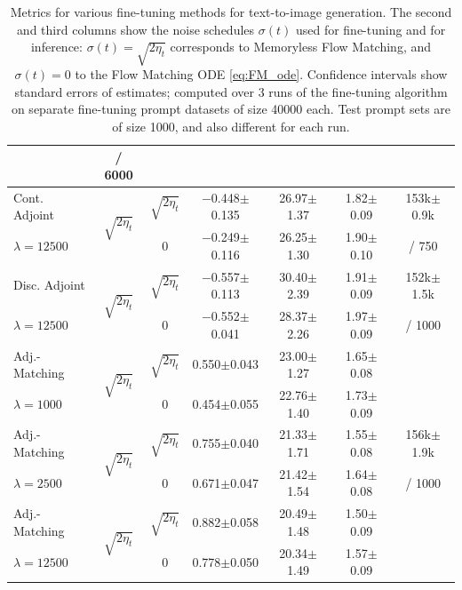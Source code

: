\begin{table}[h!]
{\begin{tabular}{lcccccc}
    & / 6000 
    \\
    \midrule %
    Cont. Adjoint & \multirow{2}{*}{$\sqrt{2 \eta_t}$} & $\sqrt{2 \eta_t}$ & $-$0.448{\tiny$\pm$0.135} & 26.97{\tiny$\pm$1.37} & 1.82{\tiny$\pm$0.09} 
    & 153k{\tiny$\pm$0.9k}
    \\
    $\lambda = 12500$                     &                                    & 0                 & $-$0.249{\tiny$\pm$0.116} & 26.25{\tiny$\pm$1.30} & 1.90{\tiny$\pm$0.10} 
    & / 750  
    \\
    \addlinespace
    Disc. Adjoint & \multirow{2}{*}{$\sqrt{2 \eta_t}$} & $\sqrt{2 \eta_t}$ & $-$0.557{\tiny$\pm$0.113} & 30.40{\tiny$\pm$2.39} & 1.91{\tiny$\pm$0.09} 
    & 152k{\tiny$\pm$1.5k}
    \\
    $\lambda = 12500$                    &                                    & 0                 & $-$0.552{\tiny$\pm$0.041} & 28.37{\tiny$\pm$2.26} & 1.97{\tiny$\pm$0.09} 
    & / 1000 
    \\
    \midrule %
    Adj.-Matching  & \multirow{2}{*}{$\sqrt{2 \eta_t}$} & $\sqrt{2 \eta_t}$ & 0.550{\tiny$\pm$0.043} & 23.00{\tiny$\pm$1.27} & 1.65{\tiny$\pm$0.08} 
    &  
    \\
    $\lambda = 1000$                     &                                    & 0                 & 0.454{\tiny$\pm$0.055} & 22.76{\tiny$\pm$1.40} & 1.73{\tiny$\pm$0.09} 
    \\
    \addlinespace
    Adj.-Matching & \multirow{2}{*}{$\sqrt{2 \eta_t}$} & $\sqrt{2 \eta_t}$ & 0.755{\tiny$\pm$0.040} & 21.33{\tiny$\pm$1.71} & 1.55{\tiny$\pm$0.08} 
    & 156k{\tiny$\pm$1.9k}
    \\
    $\lambda = 2500$                     &                                    & 0                 & 0.671{\tiny$\pm$0.047} & 21.42{\tiny$\pm$1.54} & 1.64{\tiny$\pm$0.08}
    & / 1000 
    \\
    \addlinespace
    Adj.-Matching  & \multirow{2}{*}{$\sqrt{2 \eta_t}$} & $\sqrt{2 \eta_t}$ & 0.882{\tiny$\pm$0.058} & 20.49{\tiny$\pm$1.48} & 1.50{\tiny$\pm$0.09} 
    & 
    \\
    $\lambda = 12500$                    &                                    & 0                 & 0.778{\tiny$\pm$0.050} & 20.34{\tiny$\pm$1.49} & 1.57{\tiny$\pm$0.09}
    &  
    \\
    \bottomrule
\end{tabular}
}
\caption{Metrics for various fine-tuning methods for text-to-image generation. The second and third columns show the noise schedules $\sigma(t)$ used for fine-tuning and for inference: $\sigma(t) = \sqrt{2\eta_t}$ corresponds to Memoryless Flow Matching, %
and $\sigma(t) = 0$ to the Flow Matching ODE \eqref{eq:FM_ode}. Confidence intervals show standard errors of estimates; computed over 3 runs of the fine-tuning algorithm on separate fine-tuning prompt datasets of size 40000 each. Test prompt sets are of size 1000, and also different for each run.}
\label{table:metrics_multiprompt_diversity}
\end{table}


